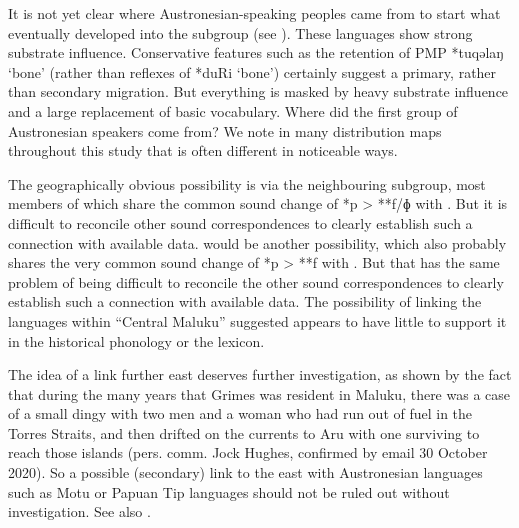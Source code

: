 It is not yet clear where Austronesian-speaking peoples came
from to start what eventually developed into the  subgroup (see ).
These languages show strong substrate influence.
Conservative features such as the retention of PMP *tuqəlaŋ ‘bone’
(rather than reflexes of *duRi ‘bone’) certainly suggest a primary,
rather than secondary migration.
But everything is masked by heavy substrate influence
and a large replacement of basic vocabulary.
Where did the first group of Austronesian speakers come from?
We note in many distribution maps throughout this study that
 is often different in noticeable ways.

The geographically obvious possibility is via the neighbouring
 subgroup, most members of which share the common sound change of *p > **f/ɸ with .
But it is difficult to reconcile other sound correspondences
to clearly establish such a connection with available data.
 would be another possibility,
which also probably shares the very common sound change of *p
> **f with .
But that has the same problem of being difficult to reconcile
the other sound correspondences to clearly establish such a connection with available data.
The possibility of linking the  languages within “Central
Maluku” suggested \citet{GrayGreenhill2009} appears to have little to support it in the historical
phonology or the lexicon.

The idea of a link further east deserves further investigation,
as shown by the fact that during the many years that Grimes was
resident in Maluku, there was a case of a small dingy with two men
and a woman who had run out of fuel in the Torres Straits,
and then drifted on the currents to Aru with one surviving to
reach those islands (pers. comm.
Jock Hughes, confirmed by email 30 October 2020).
So a possible (secondary) link to the east with Austronesian
languages such as Motu or Papuan Tip languages should not be
ruled out without investigation. See also \citet{Voorhoeve1982}.